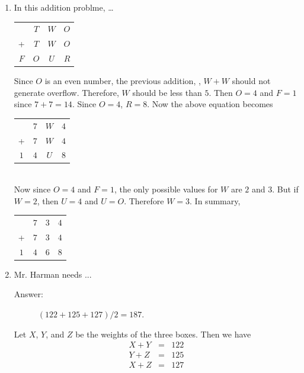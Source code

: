 \documentclass{article}
\begin{document}
\begin{enumerate}

\item In this addition problme, \ldots\\

\begin{tabular}{cccc}
&$T$	&$W$	&$O$
\\
+	&$T$	&$W$	&$O$
\\
\hline
$F$	&$O$	&$U$	&$R$
\end{tabular}

\begin{solution}

Since $O$ is an even number, the previous addition, \ie, $W+W$ should not generate overflow.
Therefore, $W$ should be less than $5$.
Then $O=4$ and $F=1$ since $7+7=14$.
Since $O=4$, $R=8$.
Now the above equation becomes\\

\begin{tabular}{cccc}
&$7$	&$W$	&$4$
\\
+	&$7$	&$W$	&$4$
\\
\hline
$1$	&$4$	&$U$	&$8$
\end{tabular}

\ \\



Now since $O=4$ and $F=1$, the only possible values for $W$ are $2$ and $3$.
But if $W=2$, then $U=4$ and $U=O$. Therefore $W=3$.
In summary,\\

\begin{tabular}{cccc}
&$7$	&$3$	&$4$
\\
+	&$7$	&$3$	&$4$
\\
\hline
$1$	&$4$	&$6$	&$8$
\end{tabular}

\end{solution}

\item Mr. Harman needs ...

\begin{description}
\item[Answer:] $(122+125+127)/2 = 187$.
\end{description}

\begin{solution}
Let $X$, $Y$, and $Z$ be the weights of the three boxes. Then we have
\begin{eqnarray*}
X + Y &=& 122
\\
Y + Z &=& 125
\\
X + Z &=& 127
\end{eqnarray*}


\end{solution}
\end{enumerate}
\end{document}
